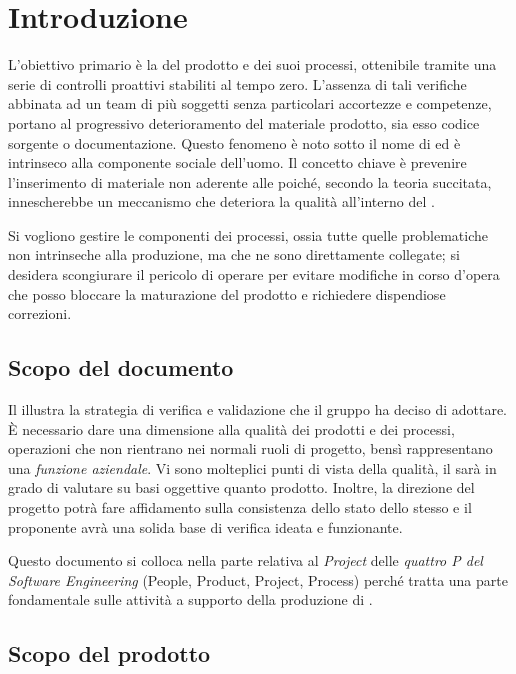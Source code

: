\section{Introduzione}
 L'obiettivo primario è la  del prodotto e dei suoi processi, ottenibile tramite una serie di controlli proattivi stabiliti al tempo zero. L'assenza di tali verifiche abbinata ad un team di più soggetti senza particolari accortezze e competenze, portano al progressivo deterioramento del materiale prodotto, sia esso codice sorgente o documentazione. Questo fenomeno è noto sotto il nome di  ed è intrinseco alla componente sociale dell'uomo. Il concetto chiave è prevenire l'inserimento di materiale non aderente alle \NormeDiProgetto poiché, secondo la teoria succitata, innescherebbe un meccanismo che deteriora la qualità all'interno del .

Si vogliono gestire le componenti  dei processi, ossia tutte quelle problematiche non intrinseche alla produzione, ma che ne sono direttamente collegate; si desidera scongiurare il pericolo di operare  per evitare modifiche in corso d'opera che posso bloccare la  maturazione del prodotto e richiedere dispendiose correzioni.

\subsection{Scopo del documento}
Il \DocTitle{} illustra la strategia di verifica e validazione che il gruppo \GroupName{} ha deciso di adottare. È necessario dare una dimensione alla qualità dei prodotti e dei processi, operazioni che non rientrano nei normali ruoli di progetto, bensì rappresentano una \emph{funzione aziendale}. Vi sono molteplici punti di vista della qualità, il  sarà in grado di valutare su basi oggettive quanto prodotto. Inoltre, la direzione del progetto potrà fare affidamento sulla consistenza dello stato dello stesso e il proponente avrà una solida base di verifica ideata e funzionante.

Questo documento si colloca nella parte relativa al \emph{Project} delle \emph{quattro P del Software Engineering} (People, Product, Project, Process) perché tratta una parte fondamentale sulle attività a supporto della produzione di \ProjectName{}.

\subsection{Scopo del prodotto}
\ScopoDelProdotto

